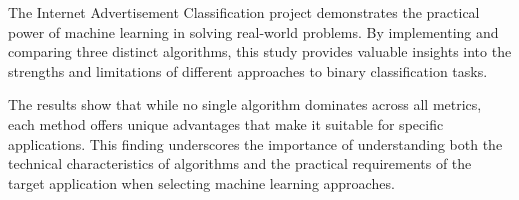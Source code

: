 The Internet Advertisement Classification project demonstrates the practical power of machine learning in solving real-world problems. By implementing and comparing three distinct algorithms, this study provides valuable insights into the strengths and limitations of different approaches to binary classification tasks.

The results show that while no single algorithm dominates across all metrics, each method offers unique advantages that make it suitable for specific applications. This finding underscores the importance of understanding both the technical characteristics of algorithms and the practical requirements of the target application when selecting machine learning approaches.